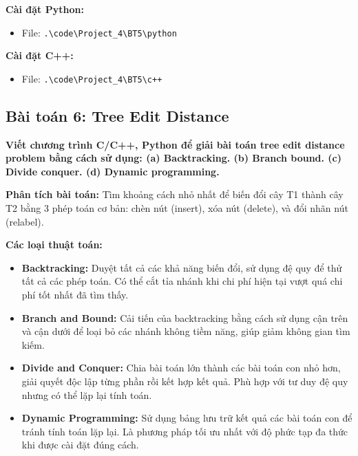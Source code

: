 \documentclass[12pt,a4paper]{article}
\begin{document}
\vspace{0.5cm}

\textbf{Cài đặt Python:}
\begin{itemize}[label=\textbullet]
    \item File: \texttt{.\textbackslash code\textbackslash Project\_4\textbackslash BT5\textbackslash python}
\end{itemize}

\textbf{Cài đặt C++:}
\begin{itemize}[label=\textbullet]
    \item File: \texttt{.\textbackslash code\textbackslash Project\_4\textbackslash BT5\textbackslash c++}
\end{itemize}

\subsection{Bài toán 6: Tree Edit Distance}

\begin{problembox}
    \textbf{Viết chương trình C/C++, Python để giải bài toán tree edit distance problem bằng cách sử dụng: (a) Backtracking. (b) Branch bound. (c) Divide conquer. (d) Dynamic programming.} 

\end{problembox}

\textbf{Phân tích bài toán:} Tìm khoảng cách nhỏ nhất để biến đổi cây T1 thành cây T2 bằng 3 phép toán cơ bản: chèn nút (insert), xóa nút (delete), và đổi nhãn nút (relabel).

\vspace{0.5cm}
\textbf{Các loại thuật toán: }

\begin{itemize}[label=\textbullet]
    \item \textbf{Backtracking:} Duyệt tất cả các khả năng biến đổi, sử dụng đệ quy để thử tất cả các phép toán. Có thể cắt tỉa nhánh khi chi phí hiện tại vượt quá chi phí tốt nhất đã tìm thấy.
    \item \textbf{Branch and Bound:} Cải tiến của backtracking bằng cách sử dụng cận trên và cận dưới để loại bỏ các nhánh không tiềm năng, giúp giảm không gian tìm kiếm.
    \item \textbf{Divide and Conquer:} Chia bài toán lớn thành các bài toán con nhỏ hơn, giải quyết độc lập từng phần rồi kết hợp kết quả. Phù hợp với tư duy đệ quy nhưng có thể lặp lại tính toán. 
    \item \textbf{Dynamic Programming:} Sử dụng bảng lưu trữ kết quả các bài toán con để tránh tính toán lặp lại. Là phương pháp tối ưu nhất với độ phức tạp đa thức khi được cài đặt đúng cách. 
\end{itemize}
\end{document}
